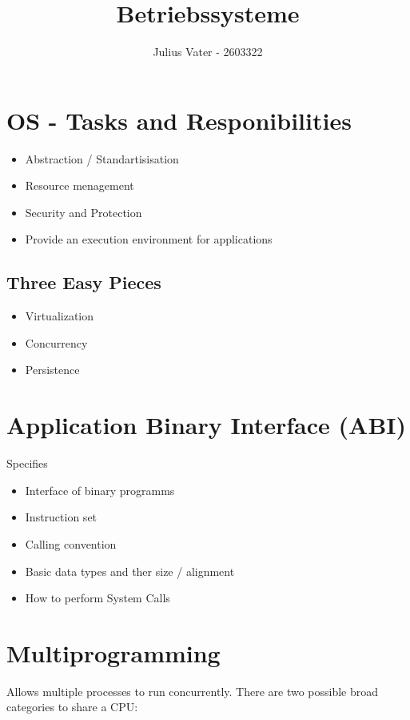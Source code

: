 \documentclass{kit}
\author{Julius Vater - 2603322}
\title{Betriebssysteme}
\begin{document}
\maketitle
\tableofcontents
\pagebreak
\section{OS - Tasks and Responibilities}
  \begin{itemize}
    \item Abstraction / Standartisisation
    \item Resource menagement
    \item Security and Protection
    \item Provide an execution environment for applications
  \end{itemize}
  \subsection{Three Easy Pieces}
    \begin{itemize}
      \item Virtualization
      \item Concurrency
      \item Persistence
    \end{itemize}
\section{\textbf{A}pplication \textbf{B}inary \textbf{I}nterface (ABI)}
  Specifies
  \begin{itemize}
    \item Interface of binary programms
    \item Instruction set
    \item Calling convention
    \item Basic data types and ther size / alignment
    \item How to perform System Calls
  \end{itemize}
\section{Multiprogramming}
  Allows multiple processes to run concurrently. There are two possible broad categories to share a CPU:
\end{document}
